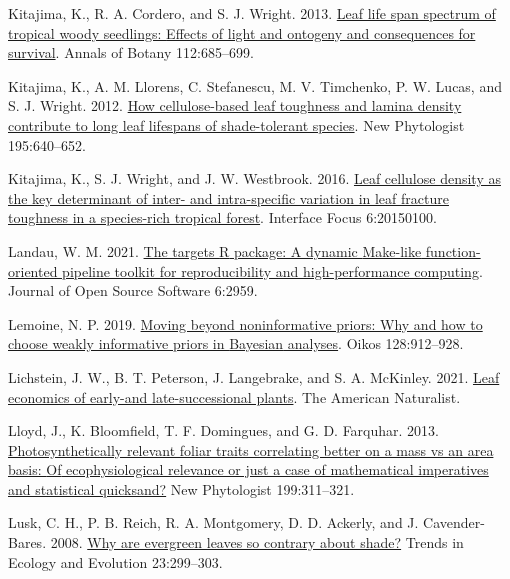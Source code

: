 \documentclass[
  12pt,
  letterpaper,
  DIV=11,
  numbers=noendperiod]{scrartcl}
\newlength{\cslhangindent}
\newlength{\cslentryspacingunit} %
\newenvironment{CSLReferences}[2] %
 {%
  \setlength{\parindent}{0pt}
  \ifodd #1
  \let\oldpar\par
  \def\par{\hangindent=\cslhangindent\oldpar}
  \fi
  \setlength{\parskip}{#2\cslentryspacingunit}
 }%
 {}
\begin{document}
\begin{CSLReferences}{1}{0}
\leavevmode{}%
Kitajima, K., R. A. Cordero, and S. J. Wright. 2013.
\href{https://doi.org/10.1093/aob/mct036}{Leaf life span spectrum of
tropical woody seedlings: {Effects} of light and ontogeny and
consequences for survival}. Annals of Botany 112:685--699.

\leavevmode{}%
Kitajima, K., A. M. Llorens, C. Stefanescu, M. V. Timchenko, P. W.
Lucas, and S. J. Wright. 2012.
\href{https://doi.org/10.1111/j.1469-8137.2012.04203.x}{How
cellulose-based leaf toughness and lamina density contribute to long
leaf lifespans of shade-tolerant species}. New Phytologist 195:640--652.

\leavevmode{}%
Kitajima, K., S. J. Wright, and J. W. Westbrook. 2016.
\href{https://doi.org/10.1098/rsfs.2015.0100}{Leaf cellulose density as
the key determinant of inter- and intra-specific variation in leaf
fracture toughness in a species-rich tropical forest}. Interface Focus
6:20150100.

\leavevmode{}%
Landau, W. M. 2021. \href{https://doi.org/10.21105/joss.02959}{The
targets {R} package: A dynamic {Make-like} function-oriented pipeline
toolkit for reproducibility and high-performance computing}. Journal of
Open Source Software 6:2959.

\leavevmode{}%
Lemoine, N. P. 2019. \href{https://doi.org/10.1111/oik.05985}{Moving
beyond noninformative priors: Why and how to choose weakly informative
priors in {Bayesian} analyses}. Oikos 128:912--928.

\leavevmode{}%
Lichstein, J. W., B. T. Peterson, J. Langebrake, and S. A. McKinley.
2021. \href{https://doi.org/10.1086/715453}{Leaf economics of early-and
late-successional plants}. The American Naturalist.

\leavevmode{}%
Lloyd, J., K. Bloomfield, T. F. Domingues, and G. D. Farquhar. 2013.
\href{https://doi.org/10.1111/nph.12281}{Photosynthetically relevant
foliar traits correlating better on a mass vs an area basis: {Of}
ecophysiological relevance or just a case of mathematical imperatives
and statistical quicksand?} New Phytologist 199:311--321.

\leavevmode{}%
Lusk, C. H., P. B. Reich, R. A. Montgomery, D. D. Ackerly, and J.
Cavender-Bares. 2008.
\href{https://doi.org/10.1016/j.tree.2008.02.006}{Why are evergreen
leaves so contrary about shade?} Trends in Ecology and Evolution
23:299--303.


\end{CSLReferences}
\end{document}
